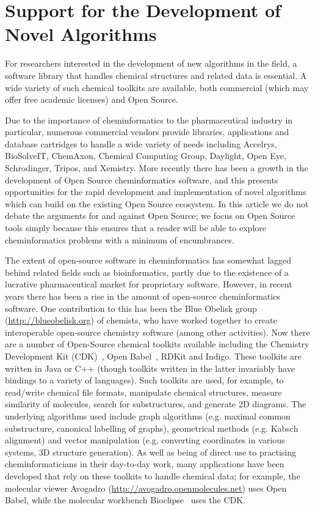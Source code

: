 \documentclass{sig-alternate}
\begin{document}
\section{Support for the Development of Novel Algorithms}
\label{sec:development-support}

For researchers interested in the development of new algorithms in the
field, a software library that handles chemical structures and related
data is essential. A wide variety of such chemical toolkits are
available, both commercial (which may offer free academic
licenses) and Open Source.

Due to the importance of cheminformatics to the pharmaceutical
industry in particular, numerous commercial vendors provide libraries,
applications and database cartridges to handle a wide variety of
needs including Accelrys, BioSolveIT, ChemAxon, Chemical Computing Group,
Daylight, Open Eye, Schrodinger, Tripos, and Xemistry. More recently
there has been a growth in the development of Open
Source cheminformatics software, and this presents opportunities for
the rapid development and implementation of novel algorithms which can
build on the existing Open Source ecosystem. In this article we do not debate the
arguments for and against Open Source; we focus on Open Source
tools simply because this ensures that a reader will be able to explore
cheminformatics problems with a minimum of encumbrances.

The extent of open-source software in cheminformatics has somewhat
lagged behind related fields such as bioinformatics, partly due to the
existence of a lucrative pharmaceutical market for proprietary
software. However, in recent years there has been a rise in the amount
of open-source cheminformatics software. One contribution to this has
been the Blue Obelisk group~\cite{BlueObelisk2011}
(\url{http://blueobelisk.org}) of chemists, who have worked together
to create interoperable open-source chemistry software (among other
activities). Now there are a number of Open-Source chemical toolkits
available including the Chemistry Development Kit
(CDK)~\cite{steinbeck2003}, Open Babel~\cite{openbabel2011}, RDKit and
Indigo. These toolkits are written in Java or C++ (though toolkits
written in the latter invariably have bindings to a variety of
languages). Such toolkits are used, for example, to read/write
chemical file formats, manipulate chemical structures, measure
similarity of molecules, search for substructures, and generate 2D
diagrams. The underlying algorithms used include graph algorithms
(e.g. maximal common substructure, canonical labelling of graphs),
geometrical methods (e.g. Kabsch alignment) and vector manipulation
(e.g. converting coordinates in various systems, 3D structure
generation). As well as being of direct use to practising
cheminformaticians in their day-to-day work, many applications have
been developed that rely on these toolkits to handle chemical data;
for example, the molecular viewer Avogadro
(\url{http://avogadro.openmolecules.net}) uses Open Babel, while the
molecular workbench Bioclipse~\cite{Bioclipse2} uses the CDK. 
\end{document}
